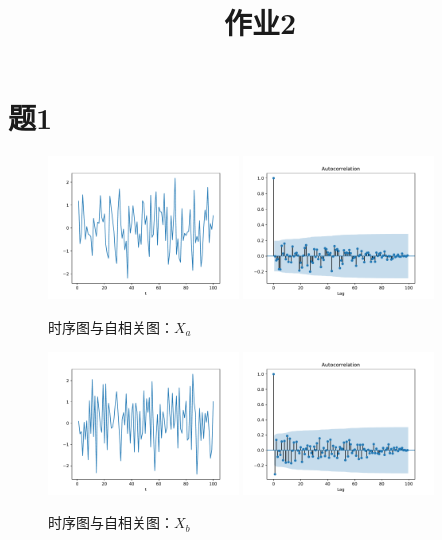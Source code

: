 \documentclass[cn]{homework}
\title{作业2}
\begin{document}
    \maketitle    

    \section{题1}
    \begin{subproblem}
        \item
        \begin{figure}[h]
            \centering
            \includegraphics[width=0.45\textwidth]{Xa.pdf}
            \includegraphics[width=0.45\textwidth]{Xa-acf.pdf}
            \caption{时序图与自相关图：$X_a$}
        \end{figure}

        \item
        \begin{figure}[h]
            \centering
            \includegraphics[width=0.45\textwidth]{Xb.pdf}
            \includegraphics[width=0.45\textwidth]{Xb-acf.pdf}
            \caption{时序图与自相关图：$X_b$}
        \end{figure}


\end{subproblem}
\end{document}
